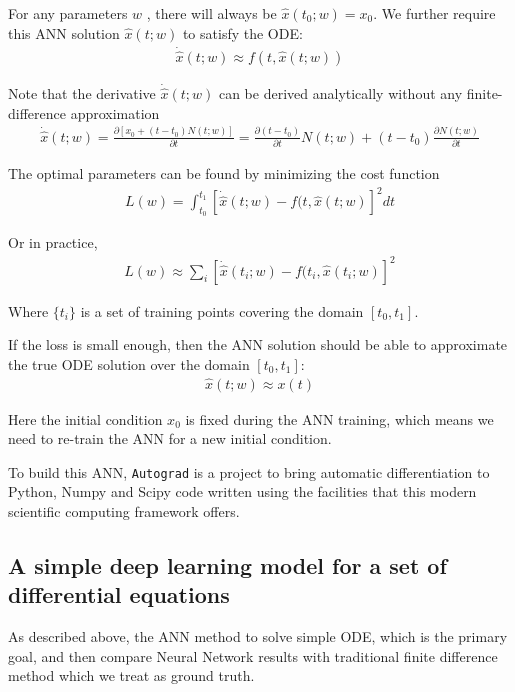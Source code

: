 \documentclass[a4paper]{article}
\numberwithin{equation}{section}
\begin{document}
For any parameters \( w \) , there will always be \( \hat{x}(t_0; w) = x_0 \). We further require this ANN solution \( \hat{x}(t; w) \) to satisfy the ODE:
\begin{align*}
  \dot{\hat{x}}(t; w) \approx f(t, \hat{x}(t; w))
\end{align*}

Note that the derivative \( \dot{\hat{x}}(t; w) \) can be derived analytically without any finite-difference approximation
\begin{align*}
  \dot{\hat{x}}(t; w) = \frac{\partial [x_0 + (t - t_0)N(t; w)]}{\partial t} = \frac{\partial (t - t_0)}{\partial t}N(t; w) + (t - t_0)\frac{\partial N(t; w)}{\partial t}
\end{align*}

The optimal parameters can be found by minimizing the cost function
\begin{align*}
  L(w) = \int_{t_0}^{t_1} [\dot{\hat{x}}(t; w) - f(t, \hat{x}(t; w)]^2 dt
\end{align*}

Or in practice,
\begin{align*}
  L(w) \approx \sum_i [\dot{\hat{x}}(t_i; w) - f(t_i, \hat{x}(t_i; w)]^2
\end{align*}

Where \( \{t_i\} \) is a set of training points covering the domain \( [t_0, t_1] \).

If the loss is small enough, then the ANN solution should be able to approximate the true ODE solution over the domain \( [t_0, t_1] \):
\begin{align*}
  \hat{x}(t; w) \approx x(t)
\end{align*}

Here the initial condition \( x_0 \) is fixed during the ANN training, which means we need to re-train the ANN for a new initial condition.

To build this ANN, \texttt{Autograd} is a project to bring automatic differentiation to Python, Numpy\cite{oliphant2007python} and Scipy\cite{jones2001scipy} code written using the facilities that this modern scientific computing framework offers.

\subsection{A simple deep learning model for a set of differential equations}
As described above, the ANN method to solve simple ODE, which is the primary goal, and then compare Neural Network results with traditional finite difference method which we treat as ground truth.
\end{document}
